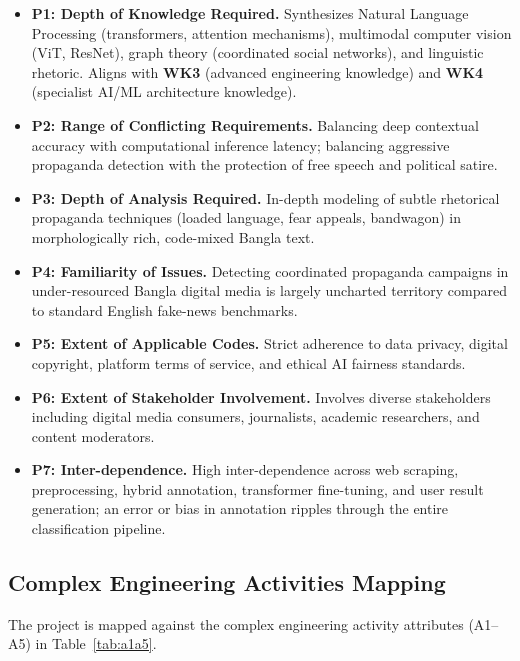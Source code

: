 \begin{itemize}
  \item \textbf{P1: Depth of Knowledge Required.} Synthesizes Natural Language
        Processing (transformers, attention mechanisms), multimodal computer vision
        (ViT, ResNet), graph theory (coordinated social networks), and linguistic
        rhetoric. Aligns with \textbf{WK3} (advanced engineering knowledge) and
        \textbf{WK4} (specialist AI/ML architecture knowledge).
  \item \textbf{P2: Range of Conflicting Requirements.} Balancing deep contextual
        accuracy with computational inference latency; balancing aggressive
        propaganda detection with the protection of free speech and political
        satire.
  \item \textbf{P3: Depth of Analysis Required.} In-depth modeling of subtle
        rhetorical propaganda techniques (loaded language, fear appeals,
        bandwagon) in morphologically rich, code-mixed Bangla text.
  \item \textbf{P4: Familiarity of Issues.} Detecting coordinated propaganda
        campaigns in under-resourced Bangla digital media is largely uncharted
        territory compared to standard English fake-news benchmarks.
  \item \textbf{P5: Extent of Applicable Codes.} Strict adherence to data privacy,
        digital copyright, platform terms of service, and ethical AI fairness
        standards.
  \item \textbf{P6: Extent of Stakeholder Involvement.} Involves diverse
        stakeholders including digital media consumers, journalists, academic
        researchers, and content moderators.
  \item \textbf{P7: Inter-dependence.} High inter-dependence across web scraping,
        preprocessing, hybrid annotation, transformer fine-tuning, and user result
        generation; an error or bias in annotation ripples through the entire
        classification pipeline.
\end{itemize}

\subsection{Complex Engineering Activities Mapping}
The project is mapped against the complex engineering activity attributes
(A1--A5) in Table~\ref{tab:a1a5}.

